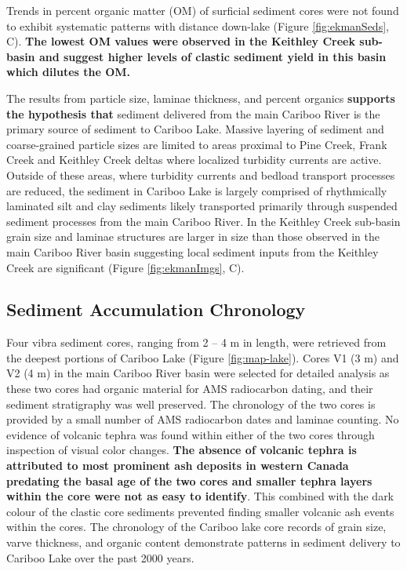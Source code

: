 \documentclass[Royal,times,doublespace,sageh]{sagej}
\begin{document}
Trends in percent organic matter (OM) of surficial sediment cores were
not found to exhibit systematic patterns with distance down-lake (Figure
\ref{fig:ekmanSeds}, C). \textbf{The lowest OM values were observed in
the Keithley Creek sub-basin and suggest higher levels of clastic
sediment yield in this basin which dilutes the OM.}

The results from particle size, laminae thickness, and percent organics
\textbf{supports the hypothesis that} sediment delivered from the main
Cariboo River is the primary source of sediment to Cariboo Lake. Massive
layering of sediment and coarse-grained particle sizes are limited to
areas proximal to Pine Creek, Frank Creek and Keithley Creek deltas
where localized turbidity currents are active. Outside of these areas,
where turbidity currents and bedload transport processes are reduced,
the sediment in Cariboo Lake is largely comprised of rhythmically
laminated silt and clay sediments likely transported primarily through
suspended sediment processes from the main Cariboo River. In the
Keithley Creek sub-basin grain size and laminae structures are larger in
size than those observed in the main Cariboo River basin suggesting
local sediment inputs from the Keithley Creek are significant (Figure
\ref{fig:ekmanImgs}, C).

\hypertarget{sediment-accumulation-chronology}{%
\subsection{Sediment Accumulation
Chronology}\label{sediment-accumulation-chronology}}

Four vibra sediment cores, ranging from 2 -- 4 m in length, were
retrieved from the deepest portions of Cariboo Lake (Figure
\ref{fig:map-lake}). Cores V1 (3 m) and V2 (4 m) in the main Cariboo
River basin were selected for detailed analysis as these two cores had
organic material for AMS radiocarbon dating, and their sediment
stratigraphy was well preserved. The chronology of the two cores is
provided by a small number of AMS radiocarbon dates and laminae
counting. No evidence of volcanic tephra was found within either of the
two cores through inspection of visual color changes. \textbf{The
absence of volcanic tephra is attributed to most prominent ash deposits
in western Canada predating the basal age of the two cores
\citep{Westgate1977, Hallett1997} and smaller tephra layers within the
core were not as easy to identify}. This combined with the dark colour
of the clastic core sediments prevented finding smaller volcanic ash
events within the cores. The chronology of the Cariboo lake core records
of grain size, varve thickness, and organic content demonstrate patterns
in sediment delivery to Cariboo Lake over the past 2000 years.
\end{document}
